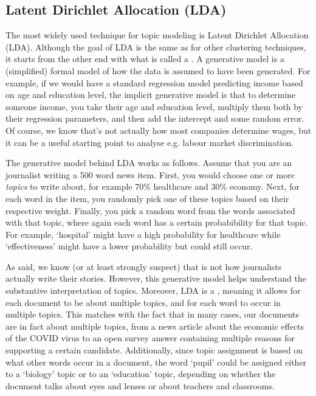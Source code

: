 \subsection{Latent Dirichlet Allocation (LDA)}

The most widely used technique for topic modeling is Latent Dirichlet Allocation (LDA).
Although the goal of LDA is the same as for other clustering techniques, it starts from the other end with what is called a .
A generative model is a (simplified) formal model of how the data is assumed to have been generated.
For example, if we would have a standard regression model predicting income based on age and education level,
the implicit generative model is that to determine someone income, you take their age and education level,
multiply them both by their regression parameters, and then add the intercept and some random error.
Of course, we know that's not actually how most companies determine wages, but it can be a useful starting point to analyse e.g. labour market discrimination.

The generative model behind LDA works as follows.
Assume that you are an journalist writing a 500 word news item.
First, you would choose one or more \emph{topics} to write about,
for example 70\% healthcare and 30\% economy.
Next, for each word in the item, you randomly pick one of these topics based on their respective weight.
Finally, you pick a random word from the words associated with that topic,
where again each word has a certain probabibility for that topic.
For example, `hospital' might have a high probability for healthcare while `effectiveness' might have a lower probability but could still occur.

As said, we know (or at least strongly suspect) that is not how journalists actually write their stories.
However, this generative model helps understand the substantive interpretation of topics.
Moreover, LDA is a , meaning it allows for each document to be about multiple topics, and for each word to occur in multiple topics.
This matches with the fact that in many cases, our documents are in fact about multiple topics,
from a news article about the economic effects of the COVID virus to an open survey answer containing multiple reasons for supporting a certain candidate. 
Additionally, since topic assignment is based on what other words occur in a document,
the word `pupil' could be assigned either to a `biology' topic or to an `education' topic, depending
on whether the document talks about eyes and lenses or about teachers and classrooms.

